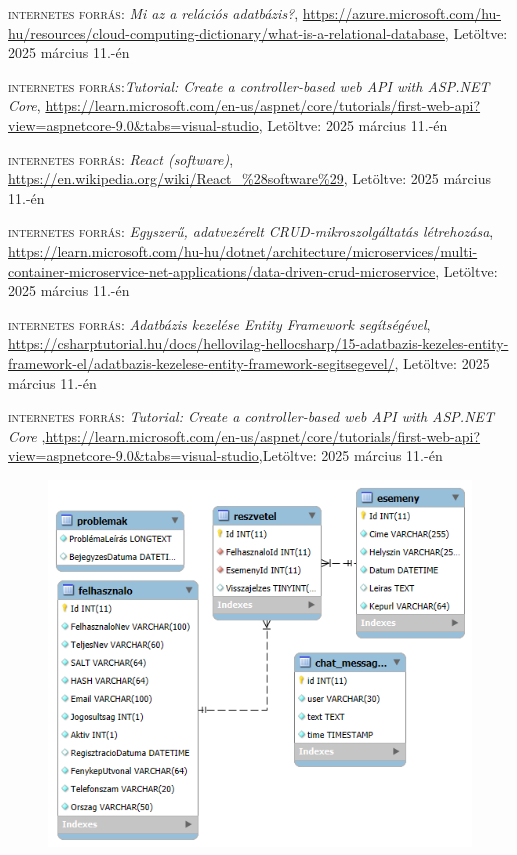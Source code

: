 \documentclass[colorlinks]{thesis-kando}
\theoremstyle{definition}
\theoremstyle{remark}
\begin{document}
\begin{thebibliography}{2}
 \textsc{internetes forrás}: \emph{Mi az a relációs adatbázis?}, \url{https://azure.microsoft.com/hu-hu/resources/cloud-computing-dictionary/what-is-a-relational-database},  Letöltve: 2025 március 11.-én

 \textsc{internetes forrás}:\emph{Tutorial: Create a controller-based web API with ASP.NET Core}, \url{https://learn.microsoft.com/en-us/aspnet/core/tutorials/first-web-api?view=aspnetcore-9.0&tabs=visual-studio},  Letöltve: 2025 március 11.-én

 \textsc{internetes forrás}: \emph{React (software)}, \url{https://en.wikipedia.org/wiki/React_%28software%29},  Letöltve: 2025 március 11.-én

 \textsc{internetes forrás}: \emph{Egyszerű, adatvezérelt CRUD-mikroszolgáltatás létrehozása}, \url{https://learn.microsoft.com/hu-hu/dotnet/architecture/microservices/multi-container-microservice-net-applications/data-driven-crud-microservice},  Letöltve: 2025 március 11.-én

 \textsc{internetes forrás}: \emph{Adatbázis kezelése Entity Framework segítségével}, \url{https://csharptutorial.hu/docs/hellovilag-hellocsharp/15-adatbazis-kezeles-entity-framework-el/adatbazis-kezelese-entity-framework-segitsegevel/},  Letöltve: 2025 március 11.-én

 \textsc{internetes forrás}: \emph{Tutorial: Create a controller-based web API with ASP.NET Core
},\url{https://learn.microsoft.com/en-us/aspnet/core/tutorials/first-web-api?view=aspnetcore-9.0&tabs=visual-studio},Letöltve: 2025 március 11.-én

\end{thebibliography}

%
\begin{figure}[bt]
	\begin{center}
		\includegraphics[width=1\textwidth]{es.png}
	\end{center}
	\end {figure}
\end{document}
